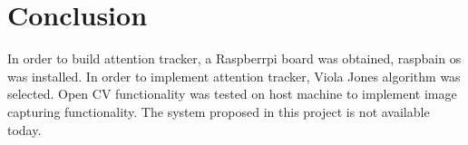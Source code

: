 \section{Conclusion}
In order to build attention tracker, a Raspberrpi board was obtained, raspbain os was installed. In order to implement attention tracker, Viola Jones algorithm was selected. Open CV functionality was tested on host machine to implement image capturing functionality. The system proposed in this project is not available today. 
